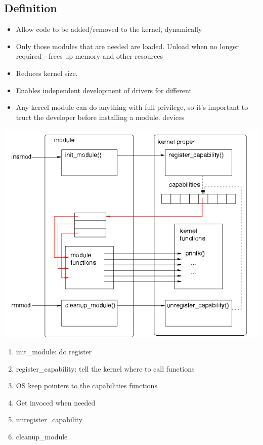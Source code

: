 \documentclass[12pt]{article}
\begin{document}
\subsection{Definition}
\begin{itemize}
    \item Allow code to be added/removed to the kernel, dynamically 
    \item Only those modules that are needed are loaded. Unload when no longer required - frees up memory and other resources 
    \item Reduces kernel size. 
    \item Enables independent development of drivers for different 
    \item Any kercel module can do anything with full privilege, so it's important to truct the developer before installing a module.
    devices
\end{itemize}
\includegraphics[width=\textwidth]{KernelWorking.png}
\begin{enumerate}
    \item init\_module: do register
    \item register\_capability: tell the kernel where to call functions
    \item OS keep pointers to the capabilities functions
    \item Get invoced when needed
    \item unregister\_capability
    \item cleanup\_module
\end{enumerate}
\end{document}
